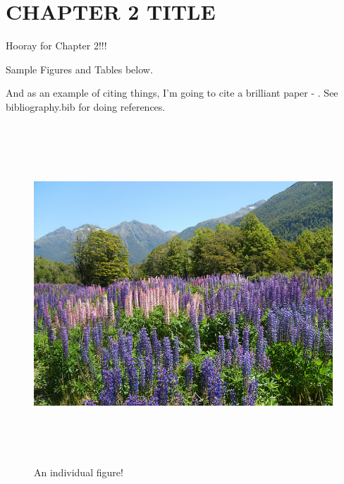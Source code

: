 \chapter{CHAPTER 2 TITLE}

Hooray for Chapter 2!!!

Sample Figures and Tables below.

And as an example of citing things, I'm going to cite a brilliant paper - \citep{jones_2016}. See bibliography.bib for doing references.

\begin{figure}
	\includegraphics[height =5in]{./Plots/nature.jpg}
	\caption{An individual figure!}
\end{figure}
        
